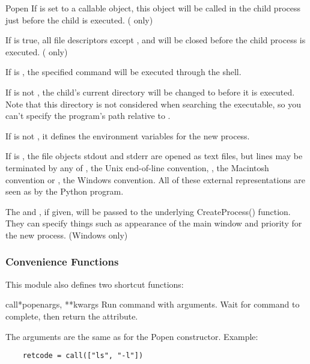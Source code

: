 \begin{classdesc}{Popen}
If  is set to a callable object, this object will be
called in the child process just before the child is executed.
(\UNIX{} only)

If  is true, all file descriptors except ,
 and  will be closed before the child process is
executed. (\UNIX{} only)

If  is , the specified command will be
executed through the shell.

If  is not , the child's current directory will be
changed to  before it is executed.  Note that this directory
is not considered when searching the executable, so you can't specify
the program's path relative to .

If  is not , it defines the environment variables
for the new process.

If  is , the file objects stdout
and stderr are opened as text files, but lines may be terminated by
any of , the Unix end-of-line convention, ,
the Macintosh convention or , the Windows convention.
All of these external representations are seen as  by the
Python program.  

The  and , if given, will be
passed to the underlying CreateProcess() function.  They can specify
things such as appearance of the main window and priority for the new
process.  (Windows only)
\end{classdesc}

\subsubsection{Convenience Functions}

This module also defines two shortcut functions:

\begin{funcdesc}{call}{*popenargs, **kwargs}
Run command with arguments.  Wait for command to complete, then
return the  attribute.

The arguments are the same as for the Popen constructor.  Example:

\begin{verbatim}
    retcode = call(["ls", "-l"])
\end{verbatim}
\end{funcdesc}

